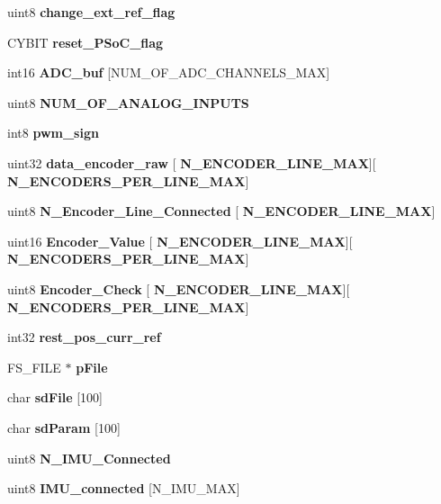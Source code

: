 \begin{DoxyCompactItemize}
uint8 \textbf{ change\+\_\+ext\+\_\+ref\+\_\+flag}
\item 
C\+Y\+B\+IT \textbf{ reset\+\_\+\+P\+So\+C\+\_\+flag}
\item 
\mbox{\label{globals_8h_a2fbad668712e226379890e1debdc9ff2}} 
int16 {\bfseries A\+D\+C\+\_\+buf} [N\+U\+M\+\_\+\+O\+F\+\_\+\+A\+D\+C\+\_\+\+C\+H\+A\+N\+N\+E\+L\+S\+\_\+\+M\+AX]
\item 
uint8 \textbf{ N\+U\+M\+\_\+\+O\+F\+\_\+\+A\+N\+A\+L\+O\+G\+\_\+\+I\+N\+P\+U\+TS}
\item 
int8 \textbf{ pwm\+\_\+sign}
\item 
\mbox{\label{globals_8h_af1bb506bc73f01ca200da713384fefe8}} 
uint32 {\bfseries data\+\_\+encoder\+\_\+raw} [\textbf{ N\+\_\+\+E\+N\+C\+O\+D\+E\+R\+\_\+\+L\+I\+N\+E\+\_\+\+M\+AX}][\textbf{ N\+\_\+\+E\+N\+C\+O\+D\+E\+R\+S\+\_\+\+P\+E\+R\+\_\+\+L\+I\+N\+E\+\_\+\+M\+AX}]
\item 
\mbox{\label{globals_8h_ae62a59fe712aba1b45a5358ece0b3d35}} 
uint8 {\bfseries N\+\_\+\+Encoder\+\_\+\+Line\+\_\+\+Connected} [\textbf{ N\+\_\+\+E\+N\+C\+O\+D\+E\+R\+\_\+\+L\+I\+N\+E\+\_\+\+M\+AX}]
\item 
\mbox{\label{globals_8h_a7bf300fb19b8dd8db6783ef124605540}} 
uint16 {\bfseries Encoder\+\_\+\+Value} [\textbf{ N\+\_\+\+E\+N\+C\+O\+D\+E\+R\+\_\+\+L\+I\+N\+E\+\_\+\+M\+AX}][\textbf{ N\+\_\+\+E\+N\+C\+O\+D\+E\+R\+S\+\_\+\+P\+E\+R\+\_\+\+L\+I\+N\+E\+\_\+\+M\+AX}]
\item 
\mbox{\label{globals_8h_a269cff8427d6a8902a38dc258d649f06}} 
uint8 {\bfseries Encoder\+\_\+\+Check} [\textbf{ N\+\_\+\+E\+N\+C\+O\+D\+E\+R\+\_\+\+L\+I\+N\+E\+\_\+\+M\+AX}][\textbf{ N\+\_\+\+E\+N\+C\+O\+D\+E\+R\+S\+\_\+\+P\+E\+R\+\_\+\+L\+I\+N\+E\+\_\+\+M\+AX}]
\item 
int32 \textbf{ rest\+\_\+pos\+\_\+curr\+\_\+ref}
\item 
\mbox{\label{globals_8h_a28568209e5c79332f574608aafcd14ec}} 
F\+S\+\_\+\+F\+I\+LE $\ast$ {\bfseries p\+File}
\item 
\mbox{\label{globals_8h_a93ea3c816e507e10c5a48cb79d624863}} 
char {\bfseries sd\+File} [100]
\item 
\mbox{\label{globals_8h_ad49779e5c549cf4cb332a929eacc6b71}} 
char {\bfseries sd\+Param} [100]
\item 
\mbox{\label{globals_8h_a47118db87acd24ae6dac18b036f360ec}} 
uint8 {\bfseries N\+\_\+\+I\+M\+U\+\_\+\+Connected}
\item 
\mbox{\label{globals_8h_a99668f3210aba0be3baec19486621bce}} 
uint8 {\bfseries I\+M\+U\+\_\+connected} [N\+\_\+\+I\+M\+U\+\_\+\+M\+AX]

\end{DoxyCompactItemize}
